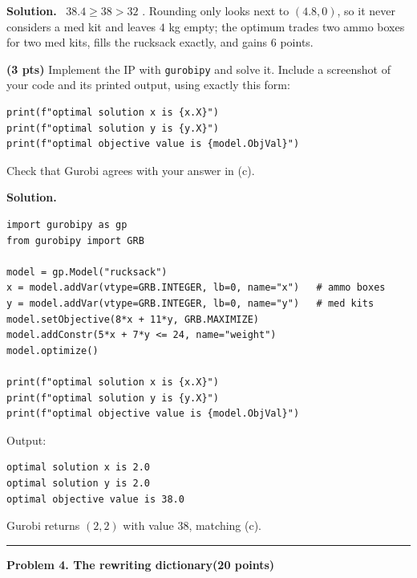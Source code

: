 \documentclass[10pt]{article}
\newcommand{\problem}[2]{%
  \par\bigskip
  {\color{ruleink}\rule{\textwidth}{1pt}}\par\nobreak\vspace{3pt}
  {\large\bfseries #2}\hfill{\normalsize\bfseries(#1 points)}\par\nobreak\vspace{4pt}}
\newenvironment{solution}
  {\par\smallskip\begingroup\color{solink}\textbf{Solution.}\ }
  {\endgroup\par}
\begin{document}
\begin{parts}
\begin{solution}
$38.4 \ge 38 > 32$ \checkmark. Rounding only looks next to $(4.8, 0)$, so it never
considers a med kit and leaves $4$ kg empty; the optimum trades two ammo boxes for two
med kits, fills the rucksack exactly, and gains $6$ points.
\end{solution}

\item \textbf{(3 pts)} Implement the IP with \texttt{gurobipy} and solve it. Include
  a screenshot of your code and its printed output, using exactly this form:
\begin{verbatim}
print(f"optimal solution x is {x.X}")
print(f"optimal solution y is {y.X}")
print(f"optimal objective value is {model.ObjVal}")
\end{verbatim}
  Check that Gurobi agrees with your answer in (c).

\begin{solution}
\begin{lstlisting}
import gurobipy as gp
from gurobipy import GRB

model = gp.Model("rucksack")
x = model.addVar(vtype=GRB.INTEGER, lb=0, name="x")   # ammo boxes
y = model.addVar(vtype=GRB.INTEGER, lb=0, name="y")   # med kits
model.setObjective(8*x + 11*y, GRB.MAXIMIZE)
model.addConstr(5*x + 7*y <= 24, name="weight")
model.optimize()

print(f"optimal solution x is {x.X}")
print(f"optimal solution y is {y.X}")
print(f"optimal objective value is {model.ObjVal}")
\end{lstlisting}
Output:
\begin{lstlisting}
optimal solution x is 2.0
optimal solution y is 2.0
optimal objective value is 38.0
\end{lstlisting}
Gurobi returns $(2, 2)$ with value $38$, matching (c).
\end{solution}
\end{parts}

\problem{20}{Problem 4. The rewriting dictionary}
\end{document}
